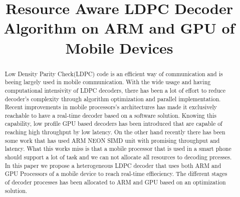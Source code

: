 \documentclass[conference]{IEEEtran}
\begin{document}
\title{Resource Aware LDPC Decoder Algorithm on ARM and GPU of Mobile Devices}

\author{
\and
{}
\and
{}
}



\maketitle

\begin{abstract}
Low Density Parity Check(LDPC) code is an efficient way of communication and is beeing largely used in mobile communication. With the wide usage and having computational intensivity of LDPC decoders, there has been a lot of effort to reduce decoder's complexity through algorithm optimization and parallel implementation. Recent improvements in mobile processors's architectures has made it exclusively reachable to have a real-time decoder based on a software solution. Knowing this capability, low profile GPU based decoders has been introduced that are capable of reaching high throughput by low latency. On the other hand recently there has been some work that has used ARM NEON SIMD unit with promising throughput and latency. What this works miss is that a mobile processor that is used in a smart phone should support a lot of task and we can not allocate all resources to decoding prcesses. In this paper we propose a heterogeneous LDPC decoder that uses both ARM and GPU Processors of a mobile device to reach real-time effieciency. The different stages of decoder processes has been allocated to ARM and GPU based on an optimization solution. 
\end{abstract}
\end{document}
